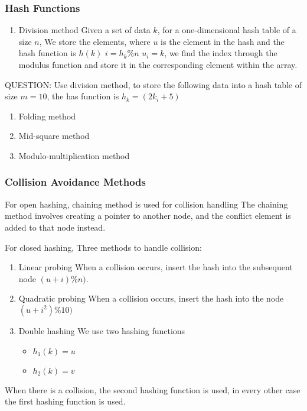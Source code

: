 \documentclass[11pt]{article}
\begin{document}
\subsubsection{Hash Functions}
\label{sec:orgfaf7567}
\begin{enumerate}
\item Division method
Given a set of data \(k\), for a one-dimensional hash table of a size \(n\), We store the elements, where \(u\) is the element in the hash and the hash function is \(h(k)\)
\(i = h_{k} \% n\)  \(u_i = k\), we find the index through the modulus function and store it in the corresponding element within the array.
\end{enumerate}

QUESTION: Use division method, to store the following data into a hash table of size \(m=10\), the has function is \(h_k = (2k_i + 5)\)

\begin{enumerate}
\item Folding method
\item Mid-square method
\item Modulo-multiplication method
\end{enumerate}
\subsubsection{Collision Avoidance Methods}
\label{sec:org5bf62ad}
For open hashing, chaining method is used for collision handling
The chaining method involves creating a pointer to another node, and the conflict element is added to that node instead.

For closed hashing,
Three methods to handle collision:
\begin{enumerate}
\item Linear probing
When a collision occurs, insert the hash into the subsequent node \((u+i)\%n)\).
\item Quadratic probing
When a collision occurs, insert the hash into the node \((u+i^2)\%10)\)
\item Double hashing
We use two hashing functions

\begin{itemize}
\item \(h_1(k) = u\)
\item \(h_2(k) = v\)
\end{itemize}
\end{enumerate}

When there is a collision, the second hashing function is used, in every other case the first hashing function is used.
\end{document}
